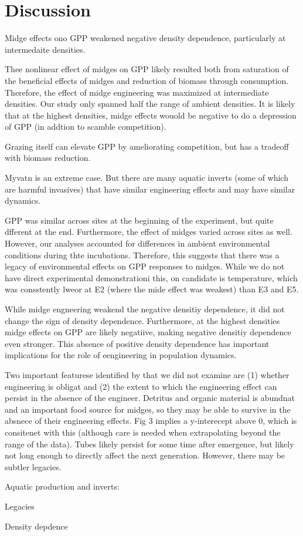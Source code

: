 
\section*{Discussion}

Midge effects ono GPP weakened negative density dependence,
particularly at intermedaite densities.

Thee nonlinear effect of midges on GPP likely resulted both from 
saturation of the beneficial effects of midges and reduction of biomass
through consumption.
Therefore, the effect of midge engineering was maximized at intermediate densities.
Our study only spanned half the range of ambient densities.
It is likely that at the highest densities, midge effects wouold be negative 
to do a depression of GPP (in addtion to scamble competition).

Grazing itself can elevate GPP by ameliorating competition, 
but has a tradeoff with biomass reduction.

Myvatn is an extreme case. 
But there are many aquatic inverts (some of which are harmful invasives)
that have similar engineering effects and may have similar dynamics.

GPP was similar across sites at the beginning of the experiment,
but quite dfferent at the end. 
Furthermore, the effect of midges varied across sites as well.
However, our analyses accounted for differences in ambient environmental conditions
during thte incubations. 
Therefore, this suggests that there was a legacy of environmental effects 
on GPP responses to midges.
While we do not have direct experimental demonstrationi this,
on candidate is temperature, which was consstently lweor at E2 
(where the mide effect was weakest) than E3 and E5.

While midge engneering weakend the negative densitiy dependence, 
it did not change the sign of density dependence. 
Furthermore, at the highest densities midge effects on GPP are likely
negatiive, making negative densitiy dependence even stronger.
This absence of positive density dependence has important implications 
for the role of eengineering in population dynamics.

Two important featurese identified by \cite{cuddington2009} that we did not examine are
(1) whether engineering is obligat and (2) the extent to which the engineering 
effect can persist in the absence of the engineer.
Detritus and organic material is abundnat and an important food source for midges,
so they may be able to survive in the absnece of their engineering effects. 
Fig 3 implies a y-interecept above 0, which is consitenet with this 
(although care is needed when extrapolating beyond the range of the data).
Tubes likely persist for some time after emergence, 
but likely not long enough to directly affect the next generation.
However, there may be subtler legacies.

Aquatic production and inverts: 
\citep{lamberti1983, wellnitz1996}
\citep{mayer1987, goldfinch2000, ingvason2004}

Legacies
\citep{cuddington2011}

Density depdence
\citep{turchin2003}
